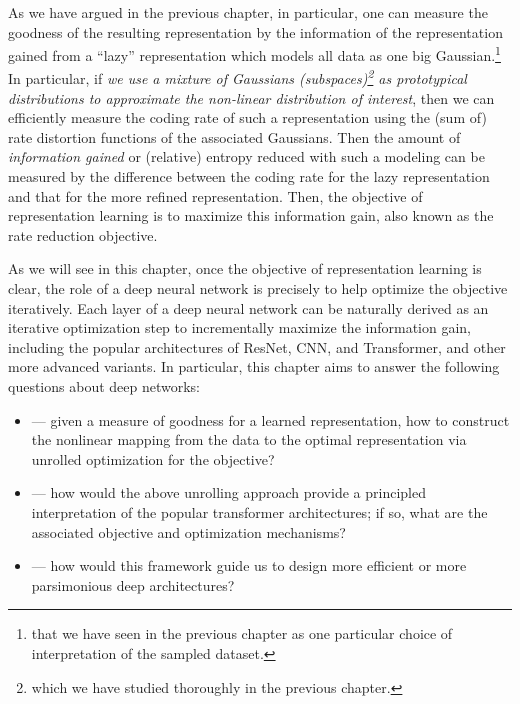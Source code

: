 \documentclass[../../book-main.tex]{subfiles}
\begin{document}
As we have argued in the previous chapter,  in particular, one can measure the goodness of the resulting representation by the information of the representation gained from a ``lazy'' representation which models all data as one big Gaussian.\footnote{that we have seen in the previous chapter as one particular choice of interpretation of the sampled dataset.} In particular, if \textit{we use a mixture of Gaussians (subspaces)\footnote{which we have studied thoroughly in the previous chapter.} as prototypical distributions to approximate the non-linear distribution of interest}, then we can efficiently measure the coding rate of such a representation using the (sum of) rate distortion functions of the associated Gaussians. Then the amount of {\em information gained} or (relative) entropy reduced with such a modeling can be measured by the difference between the coding rate for the lazy representation and that for the more refined representation. Then,  the objective of representation learning is to maximize this information gain, also known as the rate reduction objective. 

As we will see in this chapter, once the objective of representation learning is clear, the role of a deep neural network is precisely to help optimize the objective iteratively. Each layer of a deep neural network can be naturally derived as an iterative optimization step to incrementally maximize the information gain, including the popular architectures of ResNet, CNN, and Transformer, and other more advanced variants. In particular, this chapter aims to answer the following questions about deep networks:
\begin{itemize}
    \item {} --- given a measure of goodness for a learned representation, how to construct the nonlinear mapping from the data to the optimal representation via unrolled optimization for the objective?
    \item {} --- how would the above unrolling approach provide a principled interpretation of the popular transformer architectures; if so, what are the associated objective and optimization mechanisms? 
    \item {} --- how would this framework guide us to design more efficient or more parsimonious deep architectures?
\end{itemize}
\end{document}

